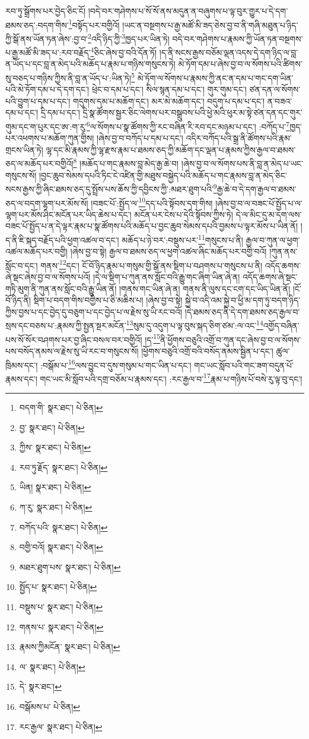 རབ་ཏུ་སྒྲོགས་པར་བྱེད་ཅིང་ངོ། །བདེ་བར་གཤེགས་པ་སོ་སོ་ནས་མདུན་ན་བཞུགས་པ་ལྟ་བུར་གྱུར་པ་དེ་དག་ཐམས་ཅད་:བདག་གིས་\footnote{བདག་གི་  སྣར་ཐང་།  པེ་ཅིན། }བསྟོད་པར་བགྱིའོ། །ཡང་ན་བསྔགས་པ་རྒྱ་མཚོ་མི་ཟད་ཅེས་བྱ་བ་ནི་གཞི་མཐུན་པ་ཉིད་ཀྱི་སྒོ་ནས་ཡོན་ཏན་ཞེས་:བྱ་བ་\footnote{བྱ་  སྣར་ཐང་།  པེ་ཅིན། }འདི་ཉིད་ཀྱི་\footnote{ཀྱིས་  སྣར་ཐང་།  པེ་ཅིན། }ཁྱད་པར་ཡིན་ཏེ། བདེ་བར་གཤེགས་པ་རྣམས་ཀྱི་ཡོན་ཏན་བསྔགས་པ་རྒྱ་མཚོ་མི་ཟད་པ་:རབ་བརྗོད་\footnote{རབ་ཏུ་རྗོད་  སྣར་ཐང་།  པེ་ཅིན། }ཅིང་ཞེས་བྱ་བའི་དོན་ཏོ། །ད་ནི་སངས་རྒྱས་བཅོམ་ལྡན་འདས་དེ་དག་ཉིད་ལ་བླ་ན་ཡོད་པ་དང་བླ་ན་མེད་པའི་མཆོད་པ་རྣམ་པ་གཉིས་གསུངས་ཏེ། མེ་ཏོག་དམ་པ་ཞེས་བྱ་བ་ལ་སོགས་པའི་ཚིགས་སུ་བཅད་པ་གཉིས་ཀྱིས་ནི་བླ་ན་ཡོད་པ་:ཡིན་ཏེ།\footnote{ཡིན།  སྣར་ཐང་།  པེ་ཅིན། } མེ་ཏོག་ལ་སོགས་པ་རྣམས་ཀྱི་ནང་ན་དམ་པ་གང་དག་ཡིན་པའི་མེ་ཏོག་དམ་པ་དེ་དག་དང་། ཕྲེང་བ་དམ་པ་དང་། སིལ་སྙན་དམ་པ་དང་། གུར་གུམ་དང་། ཙན་དན་ལ་སོགས་པའི་བྱུག་པ་དམ་པ་དང་། གདུགས་དམ་པ་མཆོག་དང་། མར་མེ་མཆོག་དང་། བདུག་པ་དམ་པ་དང་། ན་བཟའ་དམ་པ་དང་། དྲི་དམ་པ་དང་། དྲི་སྣ་ཚོགས་སྦྱར་ཅིང་ལེགས་པར་བསྒྲུབས་པའི་ཕྱེ་མའི་ཕུར་མ་སྟེ་ཙན་དན་དང་གུར་གུམ་དང་ག་པུར་དང་ཨ་:ག་རུ་\footnote{ཀ་རུ་  སྣར་ཐང་།  པེ་ཅིན། }ལ་སོགས་པ་སྣ་ཚོགས་ཀྱི་རང་བཞིན་རི་རབ་དང་མཉམ་པ་དང་། :བཀོད་པ་\footnote{བཀོད་པའི་  སྣར་ཐང་།  པེ་ཅིན། }ཁྱད་པར་འཕགས་པ་མཆོག་ཀུན་གྱིས། །ཞེས་བྱ་བ་བཀོད་པ་དམ་པ་དང་། འདིར་བཀོད་པའི་སྒྲ་ནི་ཚོགས་པའི་རྣམ་གྲངས་ཡིན་ཏེ། ལྷ་དང་མི་རྣམས་ཀྱི་ལྷ་རྫས་རྣམ་པ་ཐམས་ཅད་ཀྱི་མཆོག་དང་ལྡན་པ་རྣམས་ཀྱིས་རྒྱལ་བ་ཐམས་ཅད་ལ་མཆོད་པར་བགྱིའོ།\footnote{བགྱི་བའོ།  སྣར་ཐང་།  པེ་ཅིན། } །མཆོད་པ་གང་རྣམས་བླ་མེད་རྒྱ་ཆེ་བ། །ཞེས་བྱ་བ་ལ་སོགས་པས་ནི་བླ་ན་མེད་པ་ཡང་གསུངས་སོ། །བྱང་ཆུབ་སེམས་དཔའི་ཏིང་ངེ་འཛིན་གྱི་མཐུས་བསྐྱེད་པའི་མཆོད་པ་གང་རྣམས་བླ་ན་མེད་ཅིང་སངས་རྒྱས་ཀྱི་ཞིང་ཐམས་ཅད་དུ་སྤྲོས་པས་ཆོས་ཀྱི་དབྱིངས་ཀྱི་:མཐར་ཐུག་པའི་\footnote{མཐར་ཐུག་པས་  སྣར་ཐང་།  པེ་ཅིན། }རྒྱ་ཆེ་བ་དེ་དག་རྒྱལ་བ་ཐམས་ཅད་ལ་བདག་ལྷག་པར་མོས་སོ། །བཟང་པོ་:སྤྱོད་ལ་\footnote{སྤྱོད་པ་  སྣར་ཐང་།  པེ་ཅིན། }དད་པའི་སྟོབས་དག་གིས། །ཞེས་བྱ་བ་ལ་བཟང་པོ་སྤྱོད་པ་ལ་ལྷག་པར་མོས་ཤིང་མངོན་པར་ཡིད་ཆེས་པ་དང་། མངོན་པར་ངེས་པ་དེའི་སྟོབས་ཀྱིས་ཏེ། དེ་ལ་མིང་དུ་མ་དག་ལས་བཟང་པོ་སྤྱོད་པ་ན་དེ་ལྟར་རྣམ་པ་སྣ་ཚོགས་པའི་མཆོད་པ་བྱང་ཆུབ་སེམས་དཔའི་བྱམས་པ་ལྟར་མོས་པ་ཡིན་ནོ། །ད་ནི་ཇི་སྐད་བརྗོད་པའི་ཕྱག་འཚལ་བ་དང་། མཆོད་པ་ཉེ་བར་:བསྡུས་པར་\footnote{བསྡུས་པ་  སྣར་ཐང་།  པེ་ཅིན། }གསུངས་པ་ནི། རྒྱལ་བ་ཀུན་ལ་ཕྱག་འཚལ་མཆོད་པར་བགྱི། །ཞེས་བྱ་བ་སྟེ། རྒྱལ་བ་ཐམས་ཅད་ལ་ཕྱག་འཚལ་ཞིང་མཆོད་པར་བགྱི་བའོ། །ཀུན་ནས་སློང་བ་དང་། གནས་\footnote{གནས་པ་  སྣར་ཐང་།  པེ་ཅིན། }དང་། ངོ་བོ་ཉིད་རྣམ་པ་གསུམ་གྱི་སྒོ་ནས་སྡིག་པ་བཤགས་པ་གསུངས་པ་ནི། འདོད་ཆགས་ཞེ་སྡང་ཞེས་བྱ་བ་ལ་སོགས་པའོ། །དེ་ལ་སྡིག་པ་ཀུན་ནས་སློང་བའི་རྒྱུ་གང་ཞིག་ཡིན་ཞེ་ན། འདོད་ཆགས་ཞེ་སྡང་གཏི་མུག་ནི་ཀུན་ནས་སློང་བའི་རྒྱུ་ཡིན་ནོ། །གནས་གང་ཡིན་ཞེ་ན། གནས་ནི་ལུས་དང་ངག་དང་ཡིད་ཡིན་ནོ། །ངོ་བོ་ཉིད་ནི། སྡིག་པ་བདག་གིས་བགྱིས་པ་ཅི་མཆིས་པ། །ཞེས་བྱ་བ་སྟེ། སྐྱེ་བ་འདི་འམ་སྐྱེ་བ་ཕྱི་མ་དག་ཏུ་བདག་ཉིད་ཀྱིས་བྱས་པ་དང་བྱེད་དུ་བཅུག་པ་དང་བྱེད་པ་ལ་རྗེས་སུ་ཡི་རང་བའོ། །དེ་ཐམས་ཅད་ནི་དེ་དག་ཐམས་ཅད་རྒྱལ་བ་སྲས་དང་བཅས་པ་:རྣམས་ཀྱི་སྤྱན་སྔར་མངོན་\footnote{རྣམས་ཀྱིམངོན་  སྣར་ཐང་།  པེ་ཅིན། }སུམ་དུ་འདུག་པ་ལྟ་བུས་སྐད་ཅིག་ཙམ་:ལ་འང་\footnote{ལ་  སྣར་ཐང་།  པེ་ཅིན། }འགྱོད་བཞིན་པས་སོ་སོར་བཤགས་པར་བྱ་ཞིང་བསལ་བར་བགྱིའོ། །ད་\footnote{དེ་  སྣར་ཐང་། }ནི་ཕྱོགས་བཅུའི་འགྲོ་བ་ཀུན་དང་ཞེས་བྱ་བ་ལ་སོགས་པས་བསོད་ནམས་ལ་རྗེས་སུ་ཡི་རང་བ་གསུངས་སོ། །ཕྱོགས་བཅུའི་འགྲོ་བའི་བསོད་ནམས་སྦྱིན་པ་དང་། ཚུལ་ཁྲིམས་དང་། :བསྒོམ་པ་\footnote{བསྒོམས་པ་  པེ་ཅིན། }ལས་བྱུང་བ་དུས་གསུམ་པ་གང་ཡིན་པ་དང་། གང་ཡང་སློབ་པའི་གང་ཟག་བདུན་པོ་རྣམས་དང་། གང་ཡང་མི་སློབ་པའི་དགྲ་བཅོམ་པ་རྣམས་དང་། :རང་རྒྱལ་བ་\footnote{རང་རྒྱལ་  སྣར་ཐང་།  པེ་ཅིན། }རྣམ་པ་གཉིས་པོ་བསེ་རུ་ལྟ་བུ་དང་། 